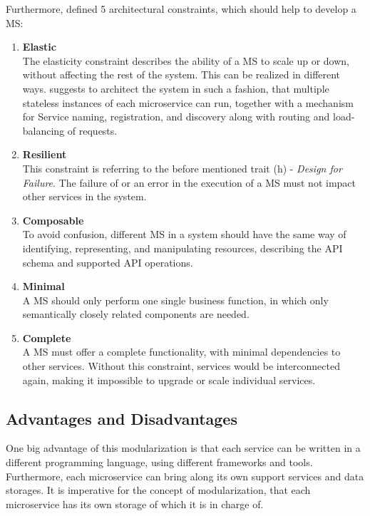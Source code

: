 Furthermore, \cite{Bugwadia15} defined 5 architectural constraints, which should help to develop a MS:

\begin{enumerate}[(1.)]
	\item \textbf{Elastic}\\
	The elasticity constraint describes the ability of a MS to scale up or down, without affecting the rest of the system. This can be realized in different ways. \cite{Bugwadia15} suggests to architect the system in such a fashion, that multiple stateless instances of each microservice can run, together with a mechanism for Service naming, registration, and discovery along with routing and load-balancing of requests.
	\item \textbf{Resilient}\\
	This constraint is referring to the before mentioned trait (h) - \emph{Design for Failure}. The failure of or an error in the execution of a MS must not impact other services in the system.
	\item \textbf{Composable}\\
	To avoid confusion, different MS in a system should have the same way of identifying, representing, and manipulating resources, describing the API schema and supported API operations.
	\item \textbf{Minimal}\\
	A MS should only perform one single business function, in which only semantically closely related components are needed.
	\item \textbf{Complete}\\
	A MS must offer a complete functionality, with minimal dependencies to other services. Without this constraint, services would be interconnected again, making it impossible to upgrade or scale individual services.
\end{enumerate}


\subsection{Advantages and Disadvantages}
One big advantage of this modularization is that each service can be written in a different programming language, using different frameworks and tools. Furthermore, each microservice can bring along its own support services and data storages. It is imperative for the concept of modularization, that each microservice has its own storage of which it is in charge of\cite{Wolff16}.

